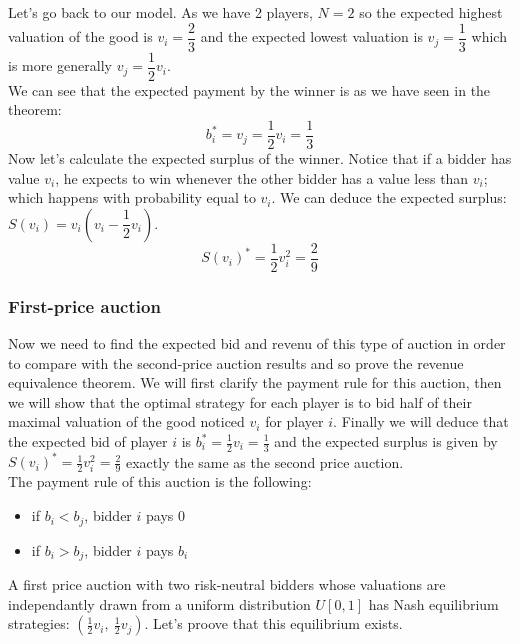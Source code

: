 \documentclass[12pt]{article}
\begin{document}
\vspace{.1cm}
\noindent Let's go back to our model. As we have 2 players, $N=2$ so the expected highest valuation of the good is $v_i = \dfrac{2}{3}$ and the expected lowest valuation is $v_j = \dfrac{1}{3}$ which is more generally $v_j = \dfrac{1}{2}v_i$.\\
We can see that the expected payment by the winner is as we have seen in the theorem:
$$\boxed{b_i^* = v_j = \dfrac{1}{2}v_i = \dfrac{1}{3}}$$
Now let's calculate the expected surplus of the winner. Notice that if a bidder has value $v_i$, he expects to win whenever the other bidder has a value less than $v_i$; which happens with probability equal to $v_i$. We can deduce the expected surplus:
$S(v_i) = v_i(v_i - \dfrac{1}{2}v_i)$.
$$\boxed{S(v_i)^* = \dfrac{1}{2}v_i^2 = \dfrac{2}{9}}$$
\vspace{1cm}
\subsubsection{First-price auction}
Now we need to find the expected bid and revenu of this type of auction in order to compare with the second-price auction results and so prove the revenue equivalence theorem. We will first clarify the payment rule for this auction, then we will show that the optimal strategy for each player is to bid half of their maximal valuation of the good noticed $v_i$ for player $i$. Finally we will deduce that the expected bid of player $i$ is $b_i^* = \frac{1}{2}v_i = \frac{1}{3}$ and the expected surplus is given by $S(v_i)^* = \frac{1}{2}v_i^2 = \frac{2}{9}$ exactly the same as the second price auction.\\

\noindent The payment rule of this auction is the following: 
\begin{itemize}
	\item if $b_i < b_j$, bidder $i$ pays $0$
	\item if $b_i > b_j$, bidder $i$ pays $b_i$
\end{itemize}
A first price auction with two risk-neutral bidders whose valuations are independantly drawn from a uniform distribution $U[0,1]$ has Nash equilibrium strategies: $(\frac{1}{2}v_i,\ \frac{1}{2}v_j)$. Let's proove that this equilibrium exists.\\
\end{document}
